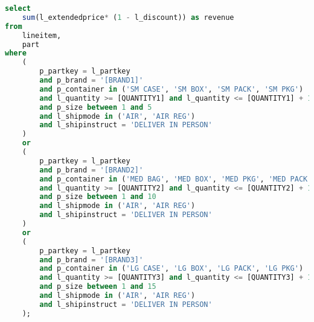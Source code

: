 \begin{enumerate}
	\begin{lstlisting}[language=SQL]
select
	sum(l_extendedprice* (1 - l_discount)) as revenue
from
	lineitem,
	part
where
	(
		p_partkey = l_partkey
		and p_brand = '[BRAND1]'
		and p_container in ('SM CASE', 'SM BOX', 'SM PACK', 'SM PKG')
		and l_quantity >= [QUANTITY1] and l_quantity <= [QUANTITY1] + 10
		and p_size between 1 and 5
		and l_shipmode in ('AIR', 'AIR REG')
		and l_shipinstruct = 'DELIVER IN PERSON'
	)
	or
	(
		p_partkey = l_partkey
		and p_brand = '[BRAND2]'
		and p_container in ('MED BAG', 'MED BOX', 'MED PKG', 'MED PACK')
		and l_quantity >= [QUANTITY2] and l_quantity <= [QUANTITY2] + 10
		and p_size between 1 and 10
		and l_shipmode in ('AIR', 'AIR REG')
		and l_shipinstruct = 'DELIVER IN PERSON'
	)
	or
	(
		p_partkey = l_partkey
		and p_brand = '[BRAND3]'
		and p_container in ('LG CASE', 'LG BOX', 'LG PACK', 'LG PKG')
		and l_quantity >= [QUANTITY3] and l_quantity <= [QUANTITY3] + 10
		and p_size between 1 and 15
		and l_shipmode in ('AIR', 'AIR REG')
		and l_shipinstruct = 'DELIVER IN PERSON'
	);
	
	\end{lstlisting}




	

\end{enumerate}

